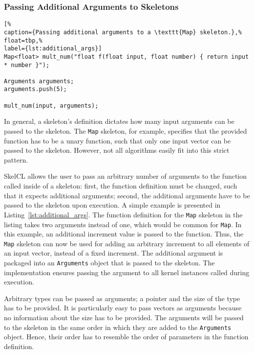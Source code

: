 \subsubsection{Passing Additional Arguments to Skeletons}

\begin{lstlisting}[%
caption={Passing additional arguments to a \texttt{Map} skeleton.},%
float=tbp,%
label={lst:additional_args}]
Map<float> mult_num("float f(float input, float number) { return input * number }");

Arguments arguments;
arguments.push(5);

mult_num(input, arguments);
\end{lstlisting}

In general, a skeleton's definition dictates how many input arguments can be passed to the skeleton.
The \texttt{Map} skeleton, for example, specifies that the provided function has to be a unary function, such that only one input vector can be passed to the skeleton.
However, not all algorithms easily fit into this strict pattern.

SkelCL allows the user to pass an arbitrary number of arguments to the function called inside of a skeleton:
first, the function definition must be changed, such that it expects additional arguments;
second, the additional arguments have to be passed to the skeleton upon execution.
A simple example is presented in Listing~\ref{lst:additional_args}.
The function definition for the \texttt{Map} skeleton in the listing takes two arguments instead of one, which would be common for \texttt{Map}.
In this example, an additional increment value is passed to the function.
Thus, the \texttt{Map} skeleton can now be used for adding an arbitrary increment to all elements of an input vector, instead of a fixed increment.
The additional argument is packaged into an \texttt{Arguments} object that is passed to the skeleton.
The implementation ensures passing the argument to all kernel instances called during execution.

Arbitrary types can be passed as arguments; a pointer and the size of the type has to be provided.
It is particularly easy to pass vectors as arguments because no information about the size has to be provided.
The arguments will be passed to the skeleton in the same order in which they are added to the \texttt{Arguments} object.
Hence, their order has to resemble the order of parameters in the function definition.




